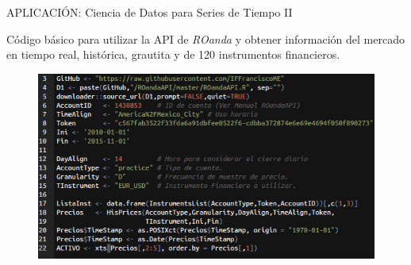 \documentclass{bredelebeamer}
\begin{document}

\begin{frame}{APLICACI\'ON: Ciencia de Datos para Series de Tiempo II}

C\'odigo b\'asico para utilizar la API de \textit{ROanda} y obtener informaci\'on del
mercado en tiempo real, hist\'orica, grautita y de 120 instrumentos financieros.

\begin{figure}[H]
\centering
\includegraphics[scale=.4]{images/ROanda2.png}
\end{figure}



\end{frame}

\end{document}
